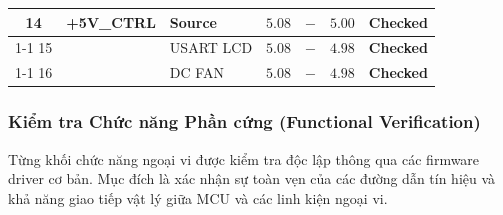 \begin{longtable}{|c|c|p{4.25cm}|>{\centering\arraybackslash}p{1.25cm}|>{\centering\arraybackslash}p{1.25cm}|>{\centering\arraybackslash}p{1.25cm}|c|}
                    14 & \multirow{3}{*}{\textbf{+5V\_CTRL}} & Source     & $5.08$ & $-$ & $5.00$ & \textcolor{modern_green}{\textbf{Checked}} \\ \cline{1-1} \cline{3-7}
                    15 &                                    & USART LCD  & $5.08$ & $-$ & $4.98$ & \textcolor{modern_green}{\textbf{Checked}} \\ \cline{1-1} \cline{3-7}
                    16 &                                    & DC FAN     & $5.08$ & $-$ & $4.98$ & \textcolor{modern_green}{\textbf{Checked}} \\ \hline
        
                \end{longtable}
        
            \subsubsection{Kiểm tra Chức năng Phần cứng (Functional Verification)}
                Từng khối chức năng ngoại vi được kiểm tra độc lập thông qua các firmware driver cơ bản. Mục đích là xác nhận sự toàn vẹn của các đường dẫn tín hiệu và khả năng giao tiếp vật lý giữa MCU và các linh kiện ngoại vi.
        
